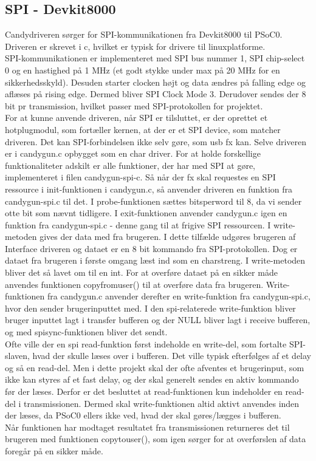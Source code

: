 \subsection{SPI - Devkit8000}
Candydriveren sørger for SPI-kommunikationen fra Devkit8000 til PSoC0. Driveren er skrevet i c, hvilket er typisk for drivere til linuxplatforme.\\
SPI-kommunikationen er implementeret med SPI bus nummer 1, SPI chip-select 0 og en hastighed på 1 MHz (et godt stykke under max på 20 MHz for en sikkerhedsskyld). Desuden starter clocken højt og data ændres på falling edge og aflæses på rising edge. Dermed bliver SPI Clock Mode 3. Derudover sendes der 8 bit pr transmission, hvilket passer med SPI-protokollen for projektet.\\
For at kunne anvende driveren, når SPI er tilsluttet, er der oprettet et hotplugmodul, som fortæller kernen, at der er et SPI device, som matcher driveren. Det kan SPI-forbindelsen ikke selv gøre, som usb fx kan. Selve driveren er i candygun.c opbygget som en char driver. For at holde forskellige funktionaliteter adskilt er alle funktioner, der har med SPI at gøre, implementeret i filen candygun-spi-c. Så når der fx skal requestes en SPI ressource i init-funktionen i candygun.c, så anvender driveren en funktion fra candygun-spi.c til det. I probe-funktionen sættes bits\textunderscore per\textunderscore word til 8, da vi sender otte bit som nævnt tidligere. I exit-funktionen anvender candygun.c igen en funktion fra candygun-spi.c - denne gang til at frigive SPI ressourcen. I write-metoden gives der data med fra brugeren. I dette tilfælde udgøres brugeren af Interface driveren og dataet er en 8 bit kommando fra SPI-protokollen. Dog er dataet fra brugeren i første omgang læst ind som en charstreng. I write-metoden bliver det så lavet om til en int.  For at overføre dataet på en sikker måde anvendes funktionen copy\textunderscore from\textunderscore user() til at overføre data fra brugeren. Write-funktionen fra candygun.c anvender derefter en write-funktion fra candygun-spi.c, hvor den sender brugerinputtet med. I den spi-relaterede write-funktion bliver bruger inputtet lagt i transfer bufferen og der NULL bliver lagt i receive bufferen, og med spi\textunderscore sync-funktionen bliver det sendt.\\ 
Ofte ville der en spi read-funktion først indeholde en write-del, som fortalte SPI-slaven, hvad der skulle læses over i bufferen. Det ville typisk efterfølges af et delay og så en read-del. Men i dette projekt skal der ofte afventes et brugerinput, som ikke kan styres af et fast delay, og der skal generelt sendes en aktiv kommando før der læses. Derfor er det besluttet at read-funktionen kun indeholder en read-del i transmissionen. Dermed skal write-funktionen altid aktivt anvendes inden der læses, da PSoC0 ellers ikke ved, hvad der skal gøres/lægges i bufferen.\\
Når funktionen har modtaget resultatet fra transmissionen returneres det til brugeren med funktionen copy\textunderscore to\textunderscore user(), som igen sørger for at overførslen af data foregår på en sikker måde.   


